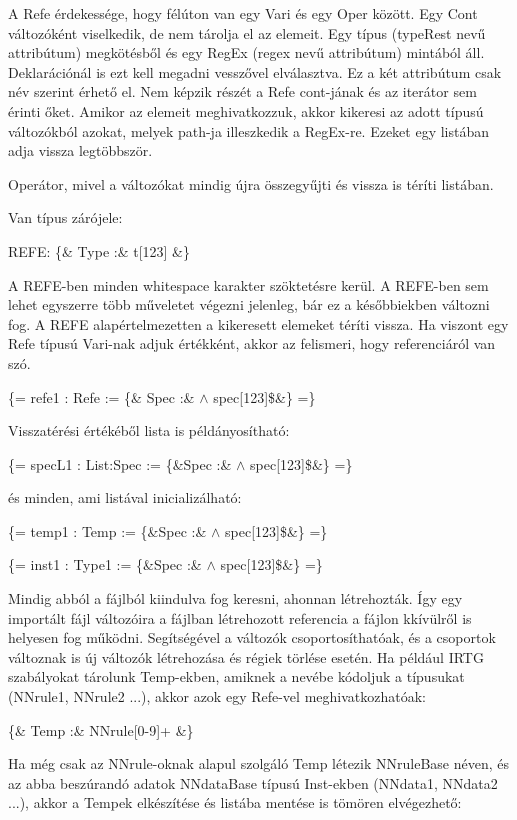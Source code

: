 {A Refe érdekessége, hogy félúton van egy Vari és egy Oper között.
Egy Cont változóként viselkedik, de nem tárolja el az elemeit.
Egy típus (typeRest nevű attribútum) megkötésből és egy RegEx (regex nevű attribútum) mintából áll.
Deklarációnál is ezt kell megadni vesszővel elválasztva.
Ez a két attribútum csak név szerint érhető el.
Nem képzik részét a Refe cont-jának és az iterátor sem érinti őket.
Amikor az elemeit meghivatkozzuk, akkor kikeresi az adott típusú változókból azokat, melyek path-ja illeszkedik a RegEx-re.
Ezeket egy listában adja vissza legtöbbször.

Operátor, mivel a változókat mindig újra összegyűjti és vissza is téríti listában.

Van típus zárójele:

REFE: \{\& Type :\& t[123] \&\}

A REFE-ben minden whitespace karakter szöktetésre kerül.
A REFE-ben sem lehet egyszerre több műveletet végezni jelenleg, bár ez a későbbiekben változni fog.
A REFE alapértelmezetten a kikeresett elemeket téríti vissza.
Ha viszont egy Refe típusú Vari-nak adjuk értékként, akkor az felismeri, hogy referenciáról van szó.

\{= refe1 : Refe := \{\& Spec :\& $\land$ spec[123]\$\&\} =\}

Visszatérési értékéből lista is példányosítható:

\{= specL1 : List:Spec := \{\&Spec :\& $\land$ spec[123]\$\&\} =\}

és minden, ami listával inicializálható:

\{= temp1 : Temp := \{\&Spec :\& $\land$ spec[123]\$\&\} =\}

\{= inst1 : Type1 := \{\&Spec :\& $\land$ spec[123]\$\&\} =\}

Mindig abból a fájlból kiindulva fog keresni, ahonnan létrehozták.
Így egy importált fájl változóira a fájlban létrehozott referencia a fájlon kkívülről is helyesen fog működni.
Segítségével a változók csoportosíthatóak, és a csoportok változnak is új változók létrehozása és régiek törlése esetén.
Ha például IRTG szabályokat tárolunk Temp-ekben, amiknek a nevébe kódoljuk a típusukat (NNrule1, NNrule2 ...),
akkor azok egy Refe-vel meghivatkozhatóak:

\{\& Temp :\& NNrule[0-9]+ \&\}

Ha még csak az NNrule-oknak alapul szolgáló Temp létezik NNruleBase néven, 
és az abba beszúrandó adatok  NNdataBase típusú Inst-ekben (NNdata1, NNdata2 ...),
akkor a Tempek elkészítése és listába mentése is tömören elvégezhető:

}
